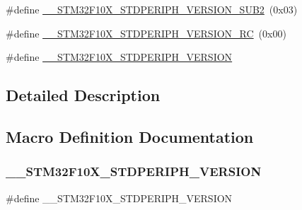 \begin{DoxyCompactItemize}
\item 
\#define \mbox{\hyperlink{group___library__configuration__section_ga3ec41777ab08436b801c9c295248a6c7}{\+\_\+\+\_\+\+S\+T\+M32\+F10\+X\+\_\+\+S\+T\+D\+P\+E\+R\+I\+P\+H\+\_\+\+V\+E\+R\+S\+I\+O\+N\+\_\+\+S\+U\+B2}}~(0x03)
\item 
\#define \mbox{\hyperlink{group___library__configuration__section_gae0abedef178fde6294fdfd3401ef6e2c}{\+\_\+\+\_\+\+S\+T\+M32\+F10\+X\+\_\+\+S\+T\+D\+P\+E\+R\+I\+P\+H\+\_\+\+V\+E\+R\+S\+I\+O\+N\+\_\+\+RC}}~(0x00)
\item 
\#define \mbox{\hyperlink{group___library__configuration__section_gafb19c8675ea01accc2f8e5f467827328}{\+\_\+\+\_\+\+S\+T\+M32\+F10\+X\+\_\+\+S\+T\+D\+P\+E\+R\+I\+P\+H\+\_\+\+V\+E\+R\+S\+I\+ON}}
\end{DoxyCompactItemize}


\subsection{Detailed Description}


\subsection{Macro Definition Documentation}
\mbox{\label{group___library__configuration__section_gafb19c8675ea01accc2f8e5f467827328}} 
\subsubsection{\texorpdfstring{\_\_STM32F10X\_STDPERIPH\_VERSION}{\_\_STM32F10X\_STDPERIPH\_VERSION}}
{\footnotesize\ttfamily \#define \+\_\+\+\_\+\+S\+T\+M32\+F10\+X\+\_\+\+S\+T\+D\+P\+E\+R\+I\+P\+H\+\_\+\+V\+E\+R\+S\+I\+ON}

